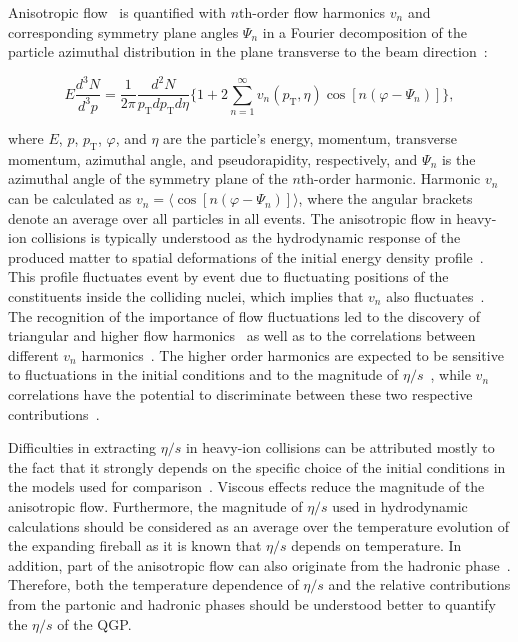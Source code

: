 Anisotropic flow~\cite{Ollitrault:1992bk} is quantified with $n{\mathrm{th}}$-order flow harmonics $v_n$ and corresponding symmetry plane angles $\Psi_n$ in a Fourier decomposition of the particle azimuthal distribution in the plane transverse to the beam direction~\cite{Voloshin:1994mz,Poskanzer:1998yz}:

\begin{equation}
E\frac{{d}^3N}{{d^3}{p}} = \frac{1}{2\pi}\frac{{d}^2N}{p_{\mathrm{T}}{d}p_{\mathrm{T}}{d}\eta} \Big\{1 + 2\sum_{n=1}^{\infty} v_n(p_{\mathrm{T}},\eta) \cos[n(\varphi - \Psi_n)]\Big\},
\label{Eq:Fourier}
\end{equation}

\noindent where $E$, $p$, $p_{\mathrm{T}}$, $\varphi$, and $\eta$ are the particle's energy, momentum, transverse momentum, azimuthal angle, and pseudorapidity, respectively, and $\Psi_n$ is the azimuthal angle of the symmetry plane of the $n{\mathrm{th}}$-order harmonic. Harmonic $v_n$ can be calculated as $v_{n} = \langle{\cos[n(\varphi - \Psi_n)]}\rangle$, where the angular brackets denote an average over all particles in all events.
The anisotropic flow in heavy-ion collisions is typically understood as the hydrodynamic response of the produced matter to spatial deformations of the initial energy density profile~\cite{Floerchinger:2013tya}.
This profile fluctuates event by event due to fluctuating positions of the constituents inside the colliding nuclei, which implies that $v_n$ also fluctuates~\cite{Miller:2003kd,Alver:2006wh}.
The recognition of the importance of flow fluctuations led to the discovery of triangular and higher flow harmonics~\cite{Alver:2010gr,ALICE:2011ab} as well as to the correlations between different $v_{n}$ harmonics~\cite{Niemi:2012aj,Aad:2014fla}.
The higher order harmonics are expected to be sensitive to fluctuations in the initial conditions and to the magnitude of $\eta/s$~\cite{Alver:2010dn,Luzum:2012wu}, while $v_{n}$ correlations have the potential to discriminate between these two respective contributions~\cite{Niemi:2012aj}.

Difficulties in extracting $\eta/s$ in heavy-ion collisions can be attributed mostly to the fact that it strongly depends on the specific choice of the initial conditions in the models used for comparison~\cite{Romatschke:2007mq,Luzum:2012wu,Shen:2011zc}.
Viscous effects reduce the magnitude of the anisotropic flow. Furthermore, the magnitude of $\eta/s$ used in hydrodynamic calculations should be considered as an average over the temperature evolution of the expanding fireball as it is known that $\eta/s$ depends on temperature. 
In addition, part of the anisotropic flow can also originate from the hadronic phase~\cite{Bozek:2011ua,Rose:2014fba,Ryu:2015vwa}. Therefore,
both the temperature dependence of $\eta/s$ and the relative contributions from the partonic and hadronic phases should be understood better to quantify the $\eta/s$ of the QGP.

